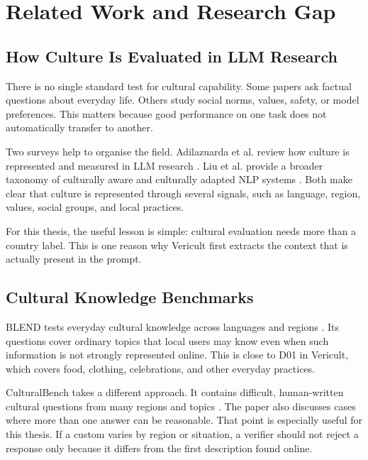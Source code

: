 \chapter{Related Work and Research Gap}
\label{chap:related}

\section{How Culture Is Evaluated in LLM Research}

There is no single standard test for cultural capability. Some papers ask factual questions about everyday life. Others study social norms, values, safety, or model preferences. This matters because good performance on one task does not automatically transfer to another.

Two surveys help to organise the field. Adilazuarda et al. review how culture is represented and measured in LLM research \parencite{adilazuarda2024culture}. Liu et al. provide a broader taxonomy of culturally aware and culturally adapted NLP systems \parencite{liu2025culturally}. Both make clear that culture is represented through several signals, such as language, region, values, social groups, and local practices.

For this thesis, the useful lesson is simple: cultural evaluation needs more than a country label. This is one reason why Vericult first extracts the context that is actually present in the prompt.

\section{Cultural Knowledge Benchmarks}

BLEND tests everyday cultural knowledge across languages and regions \parencite{myung2024blend}. Its questions cover ordinary topics that local users may know even when such information is not strongly represented online. This is close to D01 in Vericult, which covers food, clothing, celebrations, and other everyday practices.

CulturalBench takes a different approach. It contains difficult, human-written cultural questions from many regions and topics \parencite{chiu2025culturalbench}. The paper also discusses cases where more than one answer can be reasonable. That point is especially useful for this thesis. If a custom varies by region or situation, a verifier should not reject a response only because it differs from the first description found online.

